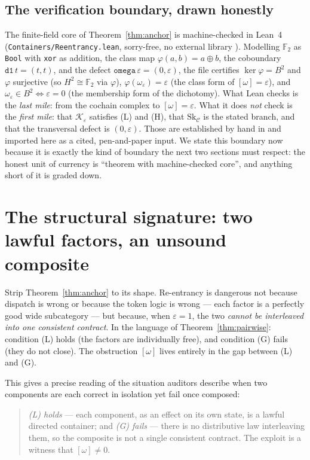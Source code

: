 \documentclass[11pt]{amsart}
\theoremstyle{definition}
\theoremstyle{remark}
\newcommand{\C}{\mathcal{C}}
\newcommand{\K}{\mathcal{K}}
\newcommand{\Sk}{\mathrm{Sk}}
\newcommand{\FF}{\mathbb{F}_2}
\begin{document}
\subsection*{The verification boundary, drawn honestly}
The finite-field core of Theorem~\ref{thm:anchor} is machine-checked in Lean~4
(\texttt{Containers/Reentrancy.lean}, sorry-free, no external library \cite{leanfile}). Modelling
$\FF$ as \texttt{Bool} with \texttt{xor} as addition, the class map $\varphi(a,b)=a\oplus b$, the
coboundary $\texttt{d1}\,t=(t,t)$, and the defect $\texttt{omega}\,\varepsilon=(0,\varepsilon)$, the
file certifies $\ker\varphi=B^2$ and $\varphi$ surjective (so $H^2\cong\FF$ via $\varphi$),
$\varphi(\omega_\varepsilon)=\varepsilon$ (the class form of $[\omega]=\varepsilon$), and
$\omega_\varepsilon\in B^2\iff\varepsilon=0$ (the membership form of the dichotomy). What Lean checks
is the \emph{last mile}: from the cochain complex to $[\omega]=\varepsilon$. What it does \emph{not}
check is the \emph{first mile}: that $\K_\varepsilon$ satisfies (L) and (H), that $\Sk_\C$ is the
stated branch, and that the transversal defect is $(0,\varepsilon)$. Those are established by hand in
\cite{analytic} and imported here as a cited, pen-and-paper input. We state this boundary now because
it is exactly the kind of boundary the next two sections must respect: the honest unit of currency is
``theorem with machine-checked core'', and anything short of it is graded down.

\section{The structural signature: two lawful factors, an unsound composite}\label{sec:shape}

Strip Theorem~\ref{thm:anchor} to its shape. Re-entrancy is dangerous not because dispatch is wrong
or because the token logic is wrong --- each factor is a perfectly good wide subcategory --- but
because, when $\varepsilon=1$, the two \emph{cannot be interleaved into one consistent contract}. In
the language of Theorem~\ref{thm:pairwise}: condition (L) holds (the factors are individually free),
and condition (G) fails (they do not close). The obstruction $[\omega]$ lives entirely in the gap
between (L) and (G).

This gives a precise reading of the situation auditors describe when two components are each correct
in isolation yet fail once composed:

\begin{quote}
\emph{(L) holds} --- each component, as an effect on its own state, is a lawful directed container;
and \emph{(G) fails} --- there is no distributive law interleaving them, so the composite is not a
single consistent contract. The exploit is a witness that $[\omega]\neq 0$.
\end{quote}
\end{document}
